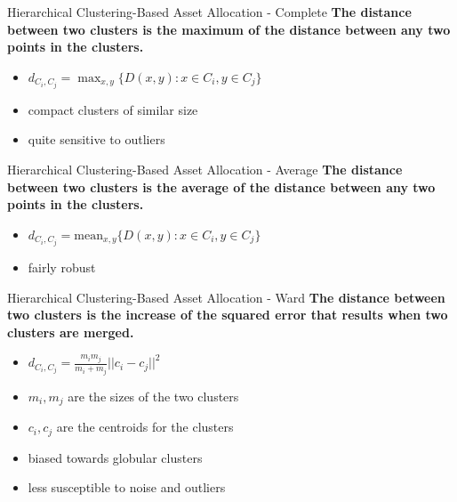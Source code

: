 \begin{frame}{Hierarchical Clustering-Based Asset Allocation - Complete}
\textbf{The distance between two clusters is the maximum of the distance between any two points in the clusters. }
    \begin{itemize}
        \item $d_{C_i,C_j}=\max_{x,y}\{D(x,y): x\in C_i, y\in C_j\}$
        \item compact clusters of similar size
        \item quite sensitive to outliers
    \end{itemize}
\end{frame}

\begin{frame}{Hierarchical Clustering-Based Asset Allocation - Average}
\textbf{ The distance between two clusters is the average of the distance between any two points in the clusters. }
    \begin{itemize}
        \item $d_{C_i,C_j}=\text{mean}_{x,y}\{D(x,y): x\in C_i, y\in C_j\}$
        \item fairly robust
    \end{itemize}
\end{frame}

\begin{frame}{Hierarchical Clustering-Based Asset Allocation - Ward}
\textbf{The distance between two clusters is the increase of the squared error that results when two clusters are merged.}
    \begin{itemize}
        \item $d_{C_i,C_j}=\frac{m_i m_j}{m_i+m_j}||c_i-c_j||^2$
        \item $m_i,m_j$ are the sizes of the two clusters
        \item $c_i,c_j$ are the centroids for the clusters
        \item  biased towards globular clusters
        \item  less susceptible to noise and outliers
        
    \end{itemize}
\end{frame}